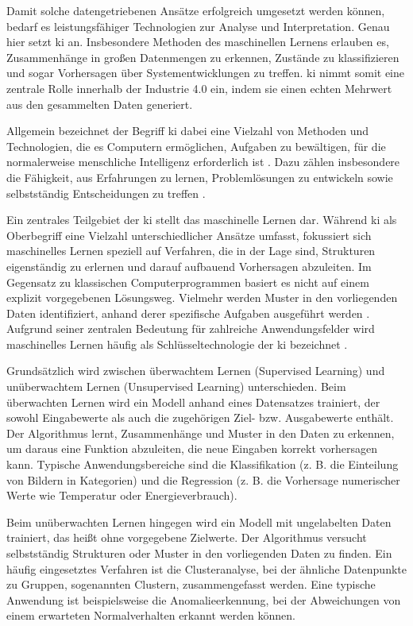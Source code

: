 Damit solche datengetriebenen Ansätze erfolgreich umgesetzt werden können, bedarf es leistungsfähiger Technologien zur Analyse und Interpretation.
Genau hier setzt \acs{ki} an.
Insbesondere Methoden des maschinellen Lernens erlauben es, Zusammenhänge in großen Datenmengen zu erkennen, Zustände zu klassifizieren und sogar Vorhersagen über Systementwicklungen zu treffen. \cite{KIEinführung} 
\acs{ki} nimmt somit eine zentrale Rolle innerhalb der Industrie 4.0 ein, indem sie einen echten Mehrwert aus den gesammelten Daten generiert.

Allgemein bezeichnet der Begriff \acs{ki} dabei eine Vielzahl von Methoden und Technologien, die es Computern ermöglichen, Aufgaben zu bewältigen, für die normalerweise menschliche Intelligenz erforderlich ist \cite{KIDefinition1}.
Dazu zählen insbesondere die Fähigkeit, aus Erfahrungen zu lernen, Problemlösungen zu entwickeln sowie selbstständig Entscheidungen zu treffen \cite{KIDefinition2}.

Ein zentrales Teilgebiet der \acs{ki} stellt das maschinelle Lernen dar. 
Während \acs{ki} als Oberbegriff eine Vielzahl unterschiedlicher Ansätze umfasst, fokussiert sich maschinelles Lernen speziell auf Verfahren, die in der Lage sind, Strukturen eigenständig zu erlernen und darauf aufbauend Vorhersagen abzuleiten. 
Im Gegensatz zu klassischen Computerprogrammen basiert es nicht auf einem explizit vorgegebenen Lösungsweg.
Vielmehr werden Muster in den vorliegenden Daten identifiziert, anhand derer spezifische Aufgaben ausgeführt werden \cite{MLDefinition}.
Aufgrund seiner zentralen Bedeutung für zahlreiche Anwendungsfelder wird maschinelles Lernen häufig als Schlüsseltechnologie der \acs{ki} bezeichnet \cite{MLSchlüsseltechnologie}.

Grundsätzlich wird zwischen überwachtem Lernen (Supervised Learning) und unüberwachtem Lernen (Unsupervised Learning) unterschieden.
Beim überwachten Lernen wird ein Modell anhand eines Datensatzes trainiert, der sowohl Eingabewerte als auch die zugehörigen Ziel- bzw. Ausgabewerte enthält.
Der Algorithmus lernt, Zusammenhänge und Muster in den Daten zu erkennen, um daraus eine Funktion abzuleiten, die neue Eingaben korrekt vorhersagen kann.
Typische Anwendungsbereiche sind die Klassifikation (z. B. die Einteilung von Bildern in Kategorien) und die Regression (z. B. die Vorhersage numerischer Werte wie Temperatur oder Energieverbrauch).

Beim unüberwachten Lernen hingegen wird ein Modell mit ungelabelten Daten trainiert, das heißt ohne vorgegebene Zielwerte. 
Der Algorithmus versucht selbstständig Strukturen oder Muster in den vorliegenden Daten zu finden.
Ein häufig eingesetztes Verfahren ist die Clusteranalyse, bei der ähnliche Datenpunkte zu Gruppen, sogenannten Clustern, zusammengefasst werden. 
Eine typische Anwendung ist beispielsweise die Anomalieerkennung, bei der Abweichungen von einem erwarteten Normalverhalten erkannt werden können. \cite{DLDefinition}

